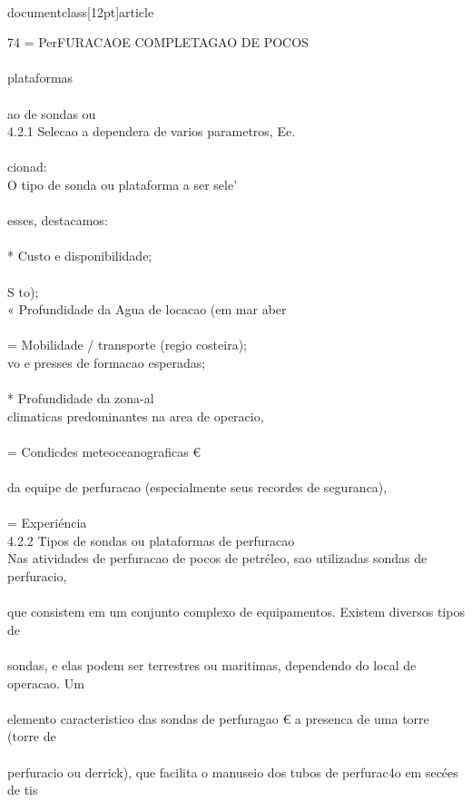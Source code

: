 \\documentclass[12pt]{article}
\begin{document}
74 = PerFURACAOE COMPLETAGAO DE POCOS\\
\\
plataformas\\
\\
ao de sondas ou\\
4.2.1 Selecao a dependera de varios parametros, Ee.\\
\\
cionad:\\
O tipo de sonda ou plataforma a ser sele'\\
\\
esses, destacamos:\\
\\
* Custo e disponibilidade;\\
\\
S to);\\
« Profundidade da Agua de locacao (em mar aber\\
\\
= Mobilidade / transporte (regio costeira);\\
vo e presses de formacao esperadas;\\
\\
* Profundidade da zona-al\\
climaticas predominantes na area de operacio,\\
\\
= Condicdes meteoceanograficas €\\
\\
da equipe de perfuracao (especialmente seus recordes de seguranca),\\
\\
= Experiéncia\\
4.2.2 Tipos de sondas ou plataformas de perfuracao\\
Nas atividades de perfuracao de pocos de petréleo, sao utilizadas sondas de perfuracio,\\
\\
que consistem em um conjunto complexo de equipamentos. Existem diversos tipos de\\
\\
sondas, e elas podem ser terrestres ou maritimas, dependendo do local de operacao. Um\\
\\
elemento caracteristico das sondas de perfuragao € a presenca de uma torre (torre de\\
\\
perfuracio ou derrick), que facilita o manuseio dos tubos de perfurac4o em secées de tis\\
\end{document}
